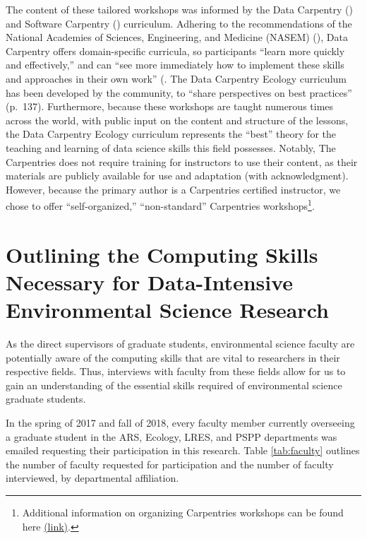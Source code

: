 \documentclass[12pt]{article}
\begin{document}
\quad The content of these tailored workshops was informed by the Data 
Carpentry (\citeyear {data-carpentry}) and Software Carpentry 
(\citeyear{software-carpentry}) curriculum. Adhering to the recommendations of 
the National Academies of Sciences, Engineering, and Medicine (NASEM)
(\citeyear{nas}), Data Carpentry offers domain-specific curricula, so
participants ``learn more quickly and effectively,'' and can ``see more
immediately how to implement these skills and approaches in their own work''
(\citep[p.\ 136]{carpentry}. The Data Carpentry Ecology curriculum has been
developed by the community, to ``share perspectives on best practices''
(p.\ 137). Furthermore, because these workshops are taught
numerous times across the world, with public input on the content and structure
of the lessons, the Data Carpentry Ecology curriculum represents the ``best''
theory for the teaching and learning of data science skills this field
possesses. Notably, The Carpentries does not require training for instructors
to use their content, as their materials are publicly available for use and
adaptation (with acknowledgment). However, because the primary author is a
Carpentries certified instructor, we chose to offer ``self-organized,''
``non-standard'' Carpentries workshops\footnote{Additional information on
organizing Carpentries workshops can be found here 
\href{https://bit.ly/carpentriesorganize}{(link)}.}. 

\section{Outlining the Computing Skills Necessary for Data-Intensive 
Environmental Science Research}
\label{sec:faculty}

\noindent As the direct supervisors of graduate students, environmental science
faculty are potentially aware of the computing skills that are vital to
researchers in their respective fields. Thus, interviews with faculty
from these fields allow for us to gain an understanding of the essential skills
required of environmental science graduate students. 

\quad In the spring of 2017 and fall of 2018, every faculty member
currently overseeing a graduate student in the ARS, Ecology, LRES, and PSPP
departments was emailed requesting their participation in this research. 
Table \ref{tab:faculty} outlines the number of faculty requested for
participation and the number of faculty interviewed, by departmental
affiliation. 
\end{document}
